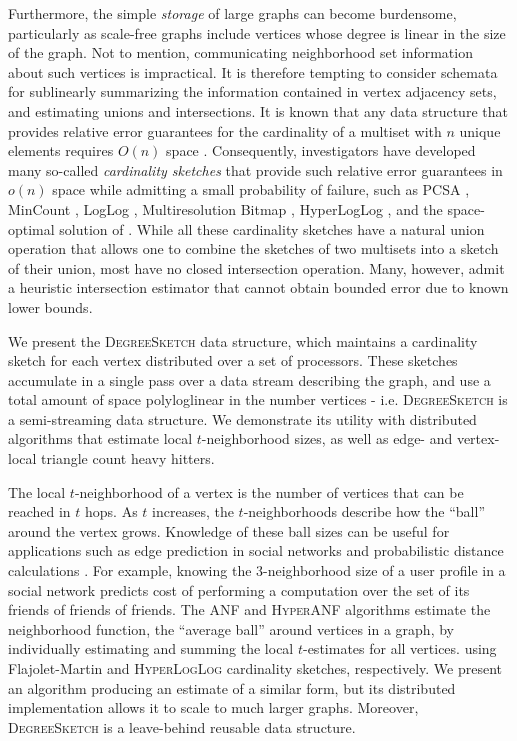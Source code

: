 \documentclass{vldb}
\newcommand{\algoname}[1]{\textnormal{\textsc{#1}}}
\begin{document}
Furthermore, the simple \emph{storage} of large graphs can become burdensome, particularly as scale-free graphs include vertices whose degree is linear in the size of the graph.
Not to mention, communicating neighborhood set information about such vertices is impractical.
It is therefore tempting to consider schemata for sublinearly summarizing the information contained in vertex adjacency sets, and estimating unions and intersections.
It is known that any data structure that provides relative error guarantees for the cardinality of a multiset with $n$ unique elements requires $O(n)$ space \cite{alon1999space}.
Consequently, investigators have developed many so-called \emph{cardinality sketches} that provide such relative error guarantees in $o(n)$ space while admitting a small probability of failure, such as PCSA \cite{flajolet1985probabilistic}, MinCount \cite{bar2002counting},  LogLog \cite{durand2003loglog}, Multiresolution Bitmap \cite{estan2003bitmap}, HyperLogLog \cite{flajolet2007hyperloglog}, and the space-optimal solution of \cite{kane2010optimal}.
While all these cardinality sketches have a natural union operation that allows one to combine the sketches of two multisets into a sketch of their union, most have no closed intersection operation.
Many, however, admit a heuristic intersection estimator that cannot obtain bounded error due to known lower bounds.

We present the \algoname{DegreeSketch} data structure, which maintains a cardinality sketch for each vertex distributed over a set of processors. 
These sketches accumulate in a single pass over a data stream describing the graph, and use a total amount of space polyloglinear in the number vertices - i.e. \algoname{DegreeSketch} is a semi-streaming data structure. 
We demonstrate its utility with distributed algorithms that estimate local $t$-neighborhood sizes, as well as edge- and vertex-local triangle count heavy hitters.


The local $t$-neighborhood of a vertex is the number of vertices that can be reached in $t$ hops.
As $t$ increases, the $t$-neighborhoods describe how the ``ball'' around the vertex grows.
Knowledge of these ball sizes can be useful for applications such as edge prediction in social networks \cite{gupta2013wtf} and probabilistic distance calculations \cite{boldi2011hyperanf, myers2014information}.
For example, knowing the 3-neighborhood size of a user profile in a social network predicts cost of performing a computation over the set of its friends of friends of friends.  
The \algoname{ANF} \cite{palmer2002anf} and \algoname{HyperANF} \cite{boldi2011hyperanf} algorithms estimate the neighborhood function, the ``average ball'' around vertices in a graph, by individually estimating and summing the local $t$-estimates for all vertices.
using Flajolet-Martin and \algoname{HyperLogLog} cardinality sketches, respectively.
We present an algorithm producing an estimate of a similar form, but its distributed implementation allows it to scale to much larger graphs. 
Moreover, \algoname{DegreeSketch} is a leave-behind reusable data structure.
\end{document}
